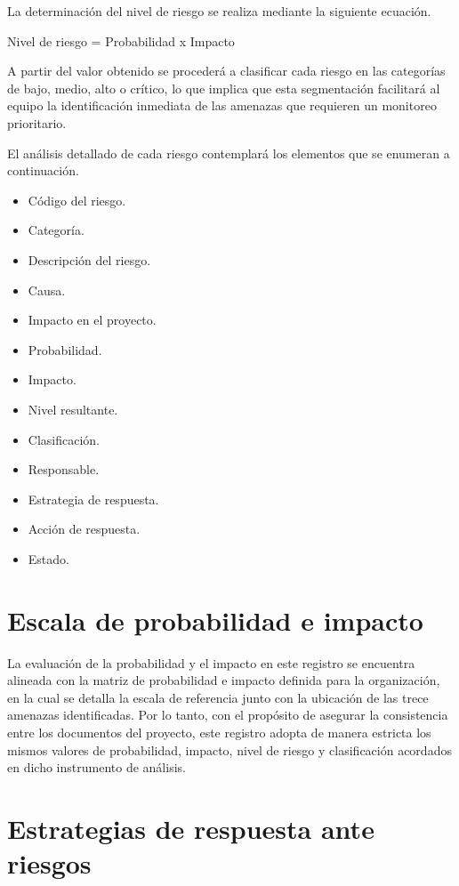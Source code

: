 \documentclass[11pt,spanish]{article}
\begin{document}
La determinación del nivel de riesgo se realiza mediante la siguiente ecuación.

\begin{center}
Nivel de riesgo = Probabilidad x Impacto
\end{center}

A partir del valor obtenido se procederá a clasificar cada riesgo en las categorías de bajo, medio, alto o crítico, lo que implica que esta segmentación facilitará al equipo la identificación inmediata de las amenazas que requieren un monitoreo prioritario.

El análisis detallado de cada riesgo contemplará los elementos que se enumeran a continuación.

\begin{itemize}[leftmargin=*, label={\textbullet}]
    \item Código del riesgo.
    \item Categoría.
    \item Descripción del riesgo.
    \item Causa.
    \item Impacto en el proyecto.
    \item Probabilidad.
    \item Impacto.
    \item Nivel resultante.
    \item Clasificación.
    \item Responsable.
    \item Estrategia de respuesta.
    \item Acción de respuesta.
    \item Estado.
\end{itemize}

\section{Escala de probabilidad e impacto}

La evaluación de la probabilidad y el impacto en este registro se encuentra alineada con la matriz de probabilidad e impacto definida para la organización, en la cual se detalla la escala de referencia junto con la ubicación de las trece amenazas identificadas. Por lo tanto, con el propósito de asegurar la consistencia entre los documentos del proyecto, este registro adopta de manera estricta los mismos valores de probabilidad, impacto, nivel de riesgo y clasificación acordados en dicho instrumento de análisis.

\section{Estrategias de respuesta ante riesgos}
\end{document}
